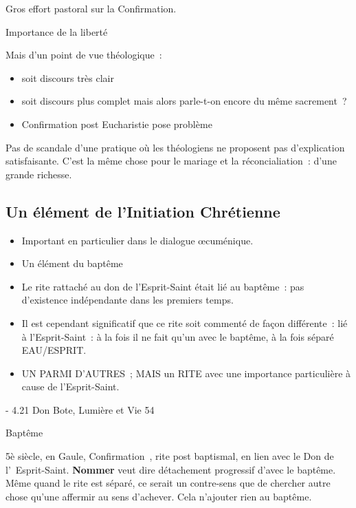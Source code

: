 Gros effort pastoral sur la Confirmation.

Importance de la liberté

Mais d'un point de vue théologique~:

\begin{itemize}
\item
  soit discours très clair
\item
  soit discours plus complet mais alors parle-t-on encore du même
  sacrement~?
\item
   
  Confirmation post Eucharistie pose problème
   
\end{itemize}

Pas de scandale d'une pratique où les théologiens ne proposent pas
d'explication satisfaisante. C'est la même chose pour le mariage et la
réconcialiation~: d'une grande richesse.

\hypertarget{un-uxe9luxe9ment-de-linitiation-chruxe9tienne}{%
\subsection{Un élément de l'Initiation
Chrétienne}\label{un-uxe9luxe9ment-de-linitiation-chruxe9tienne}}

\begin{itemize}
\item
  Important en particulier dans le dialogue œcuménique.
\item
  Un élément du baptême
\item
   
  Le rite rattaché au don de l'Esprit-Saint était lié au baptême~: pas
  d'existence indépendante dans les premiers temps.
   
\item
   
  Il est cependant significatif que ce rite soit commenté de façon
  différente~: lié à l'Esprit-Saint~: à la fois il ne fait qu'un avec le
  baptême, à la fois séparé EAU/ESPRIT.
   
\item
   
  UN PARMI D'AUTRES~; MAIS un RITE avec une importance particulière à
  cause de l'Esprit-Saint.
   
\end{itemize}

- 4.21 Don Bote, Lumière et Vie 54

Baptême

5è siècle, en Gaule, Confirmation~, rite post baptismal, en lien avec le
Don de l'~Esprit-Saint. \textbf{Nommer} veut dire détachement progressif
d'avec le baptême. Même quand le rite est séparé, ce serait un
contre-sens que de chercher autre chose qu'une affermir au sens
d'achever. Cela n'ajouter rien au baptême.

